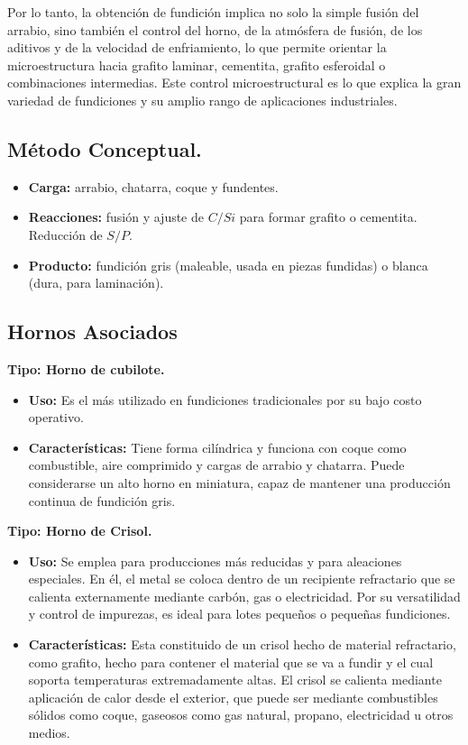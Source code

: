 \documentclass[12pt,a4paper]{article}
\begin{document}
Por lo tanto, la obtención de fundición implica no solo la simple fusión del arrabio, sino también el control del horno, de la atmósfera de fusión, de los aditivos y de la velocidad de enfriamiento, lo que permite orientar la microestructura hacia grafito laminar, cementita, grafito esferoidal o combinaciones intermedias. Este control microestructural es lo que explica la gran variedad de fundiciones y su amplio rango de aplicaciones industriales.

\subsection{Método Conceptual.}
\begin{itemize}
    \item \textbf{Carga:} arrabio, chatarra, coque y fundentes.
    \item \textbf{Reacciones:} fusión y ajuste de $ C/Si$ para formar grafito o cementita. Reducción de $S/P$.
    \item \textbf{Producto:} fundición gris (maleable, usada en piezas fundidas) o blanca (dura, para laminación).
\end{itemize}

\subsection{Hornos Asociados} \label{cubilote_seccion}

\textbf{Tipo: Horno de cubilote.}

\begin{itemize}
    \item \textbf{Uso:} Es el más utilizado en fundiciones tradicionales por su bajo costo operativo.
    \item \textbf{Características:} Tiene forma cilíndrica y funciona con coque como combustible, aire comprimido y cargas de arrabio y chatarra. Puede considerarse un alto horno en miniatura, capaz de mantener una producción continua de fundición gris.
\end{itemize}

\textbf{Tipo: Horno de Crisol.}

\begin{itemize}
    \item \textbf{Uso:} Se emplea para producciones más reducidas y para aleaciones especiales. En él, el metal se coloca dentro de un recipiente refractario que se calienta externamente mediante carbón, gas o electricidad. Por su versatilidad y control de impurezas, es ideal para lotes pequeños o pequeñas fundiciones.
    \item \textbf{Características:} Esta constituido de un crisol hecho de material refractario, como grafito, hecho para contener el material que se va a fundir y el cual soporta temperaturas extremadamente altas. El crisol se calienta mediante aplicación de calor desde el exterior, que puede ser mediante combustibles sólidos como coque, gaseosos como gas natural, propano, electricidad u otros medios.
\end{itemize}
\end{document}
